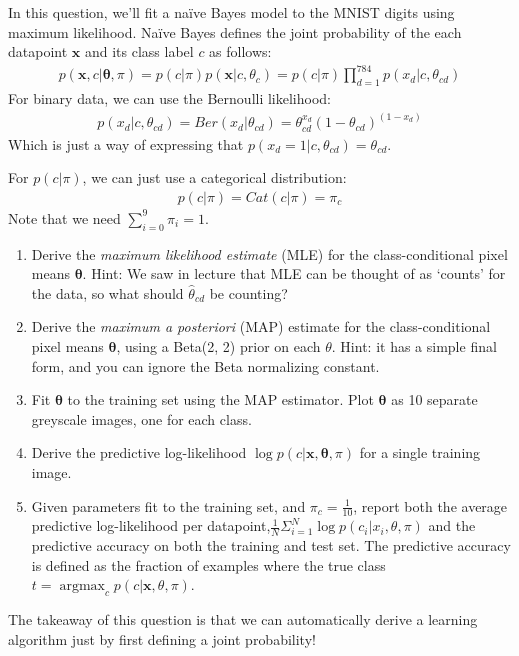 \documentclass{harvardml}
\newcommand{\bx}{\mathbf{x}}
\newcommand{\btheta}{\boldsymbol{\theta}}
\theoremstyle{plain}
\begin{document}
\begin{problem}

In this question, we'll fit a na\"ive Bayes model to the MNIST digits using maximum likelihood.
Na\"ive Bayes defines the joint probability of the each datapoint $\bx$ and its class label $c$ as follows:
%
\begin{align}
p(\bx, c | \btheta, \pi) = p(c | \pi) p(\bx | c, \theta_c) = p(c | \pi) \prod_{d=1}^{784} p( x_d | c, \theta_{cd})
\end{align}
For binary data, we can use the Bernoulli likelihood:
\begin{align}
p( x_d | c, \theta_{cd}) = Ber(x_d | \theta_{cd}) = \theta_{cd}^{x_d} ( 1 - \theta_{cd})^{(1 - x_d)}
\end{align}
Which is just a way of expressing that $p(x_d = 1 | c, \theta_{cd}) = \theta_{cd}$.

For $p(c | \pi)$, we can just use a categorical distribution:
\begin{align}
p(c | \pi) = Cat(c|\pi) = \pi_c
\end{align}
Note that we need $\sum_{i=0}^9 \pi_{i} = 1$.

\begin{enumerate}[label=(\alph*)]
\item Derive the \emph{maximum likelihood estimate} (MLE) for the class-conditional pixel means $\btheta$. Hint: We saw in lecture that MLE can be thought of as `counts' for the data, so what should $\hat \theta_{cd}$ be counting?
\item Derive the \emph{maximum a posteriori} (MAP) estimate for the class-conditional pixel means $\btheta$, using a Beta(2, 2) prior on each $\theta$.  Hint: it has a simple final form, and you can ignore the Beta normalizing constant.
\item Fit $\btheta$ to the training set using the MAP estimator.  Plot $\btheta$ as 10 separate greyscale images, one for each class.
\item Derive the predictive log-likelihood $\log p(c | \bx, \btheta, \pi)$ for a single training image.
\item Given parameters fit to the training set, and $\pi_c = \frac{1}{10}$, report both the average predictive log-likelihood per datapoint,$\frac{1}{N}\Sigma_{i=1}^N \log p(c_i | x_i,\theta,\pi)$ and the predictive accuracy on both the training and test set.  The predictive accuracy is defined as the fraction of examples where the true class $t = \operatorname{argmax}_c p(c | \bx, \theta, \pi)$.
\end{enumerate}
The takeaway of this question is that we can automatically derive a learning algorithm just by first defining a joint probability!
\end{problem}
\end{document}
